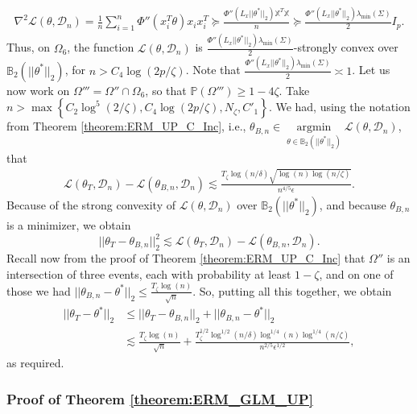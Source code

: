 \documentclass{article}
\begin{document}
\begin{align*}
\nabla^2\mathcal{L}(\theta, \mathcal{D}_n) = \frac{1}{n}\sum_{i = 1}^n\Phi''(x_i^T\theta)x_ix_i^T \succeq \frac{\Phi''(L_x||\theta^*||_2)\mathbb{X}^T\mathbb{X}}{n} \succeq \frac{\Phi''(L_x||\theta^*||_2)\lambda_{\min}(\Sigma)}{2}I_p.
\end{align*}
Thus, on $\Omega_6$, the function $\mathcal{L}(\theta, \mathcal{D}_n)$ is $\frac{\Phi''(L_x||\theta^*||_2)\lambda_{\min}(\Sigma)}{2}$-strongly convex over $\mathbb{B}_2(||\theta^*||_2)$, for $n > C_4\log(2p/\zeta)$. Note that $\frac{\Phi''(L_x||\theta^*||_2)\lambda_{\min}(\Sigma)}{2} \asymp 1$. Let us now work on $\Omega''' = \Omega'' \cap \Omega_6$, so that $\mathbb{P}(\Omega''') \geq 1 - 4\zeta$. Take $n > \max\left\{C_2\log^5(2/\zeta), C_4\log(2p/\zeta), N_\zeta, C'_1\right\}$.  We had, using the notation from Theorem \ref{theorem:ERM_UP_C_Inc}, i.e., $\theta_{B, n} \in \mathop{\arg\min}\limits_{\theta \in \mathbb{B}_2(||\theta^*||_2)}\mathcal{L}(\theta, \mathcal{D}_n)$, that
\begin{align*}
\mathcal{L}(\theta_T, \mathcal{D}_n) - \mathcal{L}(\theta_{B, n}, \mathcal{D}_n) \lesssim \frac{T_\zeta\log(n/\delta)\sqrt{\log(n)\log(n/\zeta)}}{n^{4/5}\epsilon}.
\end{align*}
Because of the strong convexity of $\mathcal{L}(\theta, \mathcal{D}_n)$ over $\mathbb{B}_2(||\theta^*||_2)$, and because $\theta_{B, n}$ is a minimizer, we obtain
$$||\theta_T - \theta_{B, n}||_2^2 \lesssim \mathcal{L}(\theta_T, \mathcal{D}_n) - \mathcal{L}(\theta_{B, n}, \mathcal{D}_n).$$
Recall now from the proof of Theorem \ref{theorem:ERM_UP_C_Inc} that $\Omega''$ is an intersection of three events, each with probability at least $1 - \zeta$, and on one of those we had $||\theta_{B, n} - \theta^*||_2 \leq \frac{T_\zeta\log(n)}{\sqrt{n}}$. So, putting all this together, we obtain 
\begin{align*}
||\theta_T - \theta^*||_2 &\leq ||\theta_T - \theta_{B, n}||_2 + ||\theta_{B, n} - \theta^*||_2\\
&\lesssim \frac{T_\zeta\log(n)}{\sqrt{n}} + \frac{T_\zeta^{1/2}\log^{1/2}(n/\delta)\log^{1/4}(n)\log^{1/4}(n/\zeta)}{n^{2/5}\epsilon^{1/2}},
\end{align*}
as required.

\subsubsection{Proof of Theorem \ref{theorem:ERM_GLM_UP}}
\label{ThmERMGLM}
\end{document}
